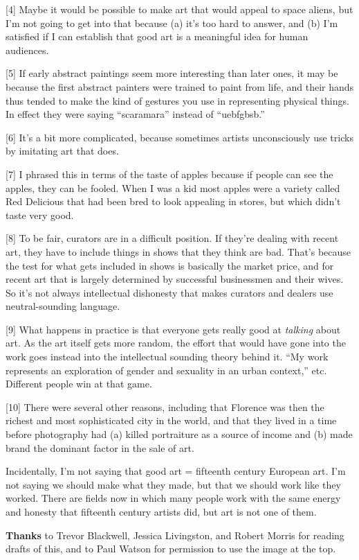 {[}4{]} Maybe it would be possible to make art that would appeal to
space aliens, but I'm not going to get into that because (a) it's too
hard to answer, and (b) I'm satisfied if I can establish that good art
is a meaningful idea for human audiences.

{[}5{]} If early abstract paintings seem more interesting than later
ones, it may be because the first abstract painters were trained to
paint from life, and their hands thus tended to make the kind of
gestures you use in representing physical things. In effect they were
saying ``scaramara'' instead of ``uebfgbsb.''

{[}6{]} It's a bit more complicated, because sometimes artists
unconsciously use tricks by imitating art that does.

{[}7{]} I phrased this in terms of the taste of apples because if people
can see the apples, they can be fooled. When I was a kid most apples
were a variety called Red Delicious that had been bred to look appealing
in stores, but which didn't taste very good.

{[}8{]} To be fair, curators are in a difficult position. If they're
dealing with recent art, they have to include things in shows that they
think are bad. That's because the test for what gets included in shows
is basically the market price, and for recent art that is largely
determined by successful businessmen and their wives. So it's not always
intellectual dishonesty that makes curators and dealers use
neutral-sounding language.

{[}9{]} What happens in practice is that everyone gets really good at
\emph{talking} about art. As the art itself gets more random, the effort
that would have gone into the work goes instead into the intellectual
sounding theory behind it. ``My work represents an exploration of gender
and sexuality in an urban context,'' etc. Different people win at that
game.

{[}10{]} There were several other reasons, including that Florence was
then the richest and most sophisticated city in the world, and that they
lived in a time before photography had (a) killed portraiture as a
source of income and (b) made brand the dominant factor in the sale of
art.

Incidentally, I'm not saying that good art = fifteenth century European
art. I'm not saying we should make what they made, but that we should
work like they worked. There are fields now in which many people work
with the same energy and honesty that fifteenth century artists did, but
art is not one of them.

\textbf{Thanks} to Trevor Blackwell, Jessica Livingston, and Robert
Morris for reading drafts of this, and to Paul Watson for permission to
use the image at the top.
